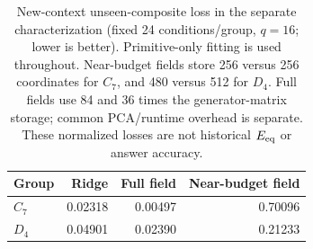 \begin{table}[htbp]\centering\small
\begin{tabular}{lrrr}\toprule
Group & Ridge & Full field & Near-budget field \\
\midrule
$C_7$ & 0.02318 & 0.00497 & 0.70096 \\
$D_4$ & 0.04901 & 0.02390 & 0.21233 \\
\bottomrule\end{tabular}
\caption{New-context unseen-composite loss in the separate characterization (fixed 24 conditions/group, $q=16$; lower is better). Primitive-only fitting is used throughout. Near-budget fields store 256 versus 256 coordinates for $C_7$, and 480 versus 512 for $D_4$. Full fields use 84 and 36 times the generator-matrix storage; common PCA/runtime overhead is separate. These normalized losses are not historical $E_{\rm eq}$ or answer accuracy.}
\label{tab:characterization-main}\end{table}

